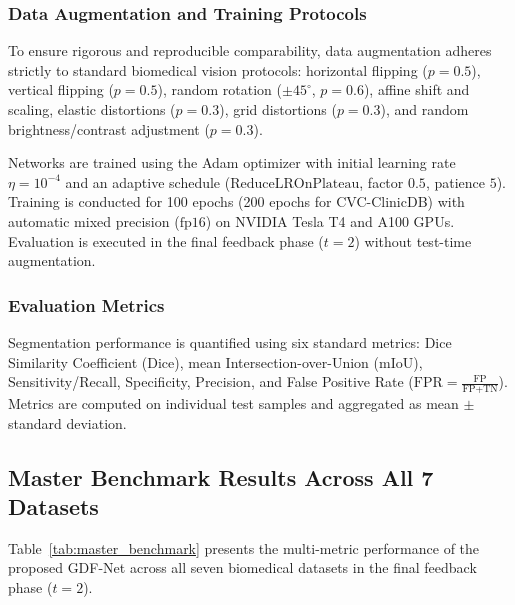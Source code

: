 \subsubsection{Data Augmentation and Training Protocols}
To ensure rigorous and reproducible comparability, data augmentation adheres strictly to standard biomedical vision protocols: horizontal flipping ($p=0.5$), vertical flipping ($p=0.5$), random rotation ($\pm 45^\circ$, $p=0.6$), affine shift and scaling, elastic distortions ($p=0.3$), grid distortions ($p=0.3$), and random brightness/contrast adjustment ($p=0.3$). 

Networks are trained using the Adam optimizer with initial learning rate $\eta = 10^{-4}$ and an adaptive schedule ($\text{ReduceLROnPlateau}$, factor $0.5$, patience $5$). Training is conducted for 100 epochs (200 epochs for CVC-ClinicDB) with automatic mixed precision ($\text{fp16}$) on NVIDIA Tesla T4 and A100 GPUs. Evaluation is executed in the final feedback phase ($t=2$) without test-time augmentation.

\subsubsection{Evaluation Metrics}
Segmentation performance is quantified using six standard metrics: Dice Similarity Coefficient (Dice), mean Intersection-over-Union (mIoU), Sensitivity/Recall, Specificity, Precision, and False Positive Rate ($\text{FPR} = \frac{\text{FP}}{\text{FP} + \text{TN}}$). Metrics are computed on individual test samples and aggregated as mean $\pm$ standard deviation.

\subsection{Master Benchmark Results Across All 7 Datasets}
Table~\ref{tab:master_benchmark} presents the multi-metric performance of the proposed GDF-Net across all seven biomedical datasets in the final feedback phase ($t=2$).

